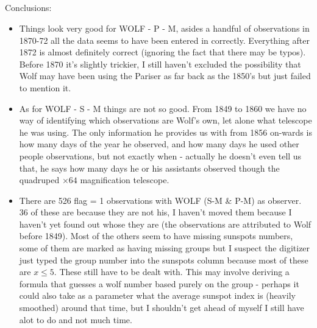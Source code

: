 \documentclass[12pt]{article}
\begin{document}
\\
\\
\\

\\

Conclusions:
\begin{itemize}
    \item Things look very good for WOLF - P - M, asides a handful of observations in 1870-72 all the data seems to have been entered in correctly. Everything after 1872 is almost definitely correct (ignoring the fact that there may be typos). Before 1870 it's slightly trickier, I still haven't excluded the possibility that Wolf may have been using the Pariser as far back as the 1850's but just failed to mention it. 
    \item As for WOLF - S - M things are not so good. From 1849 to 1860 we have no way of identifying which observations are Wolf's own, let alone what telescope he was using. The only information he provides us with from 1856 on-wards is how many days of the year he observed, and how many days he used other people observations, but not exactly when - actually he doesn't even tell us that, he says how many days he or his assistants observed though the quadruped $\times 64$ magnification telescope.
    \item There are 526 flag = 1 observations with WOLF (S-M \& P-M) as observer. 36 of these are because they are not his, I haven't moved them because I haven't yet found out whose they are (the observations are attributed to Wolf before 1849). Most of the others seem to have missing sunspots numbers, some of them are marked as having missing groups but I suspect the digitizer just typed the group number into the sunspots column because most of these are $x\leq 5$. These still have to be dealt with. This may involve deriving a formula that guesses a wolf number based purely on the group - perhaps it could also take as a parameter what the average sunspot index is (heavily smoothed) around that time, but I shouldn't get ahead of myself I still have alot to do and not much time.
\end{itemize}
\end{document}
